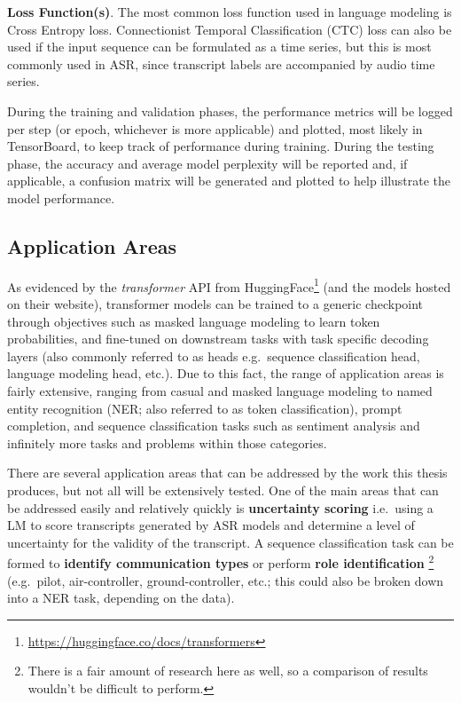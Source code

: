 \documentclass[10pt]{article}
\begin{document}
        \textbf{Loss Function(s)}.
        The most common loss function used in language modeling is Cross Entropy loss. Connectionist Temporal Classification (CTC) loss
        can also be used if the input sequence can be formulated as a time series, but this is most commonly used in ASR, since
        transcript labels are accompanied by audio time series.


        During the training and validation phases, the performance metrics will be logged per step (or epoch, whichever is more
        applicable) and plotted, most likely in TensorBoard, to keep track of performance during training. During the testing phase,
        the accuracy and average model perplexity will be reported and, if applicable, a confusion matrix will be generated and plotted
        to help illustrate the model performance.


        \subsection{Application Areas}
        As evidenced by the \textit{transformer} API from HuggingFace\footnote{\url{https://huggingface.co/docs/transformers}} (and the models hosted
        on their website), transformer models can be trained to a generic checkpoint through objectives such as masked language modeling to learn
        token probabilities, and fine-tuned on downstream tasks with task specific decoding layers (also commonly referred to as heads
        e.g.~sequence classification head, language modeling head, etc.). Due to this fact, the range of application areas is fairly
        extensive, ranging from casual and masked language modeling to named entity recognition (NER; also referred to as token
        classification), prompt completion, and sequence classification tasks such as sentiment analysis and infinitely more tasks and
        problems within those categories.


        There are several application areas that can be addressed by the work this thesis produces, but not all will be extensively
        tested. One of the main areas that can be addressed easily and relatively quickly is \textbf{uncertainty scoring} i.e.~using a
        LM to score transcripts generated by ASR models and determine a level of uncertainty for the validity of the transcript.
        A sequence classification task can be formed to \textbf{identify communication types} or perform \textbf{role identification}
        \footnote{There is a fair amount of research here as well, so a comparison of results wouldn't be difficult to perform.}
        (e.g.~pilot, air-controller, ground-controller, etc.; this could also be broken down into a NER task, depending on the data).
\end{document}
